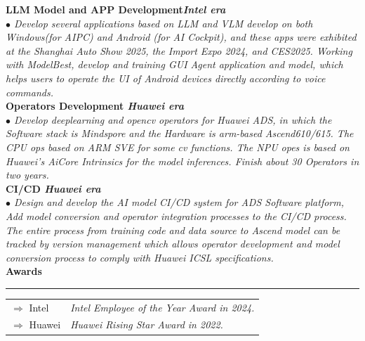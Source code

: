 \documentclass[a4paper,12pt,final]{memoir}
\newcommand{\myThemeColor}{RoyalBlue}
\newcommand{\SmallSep}{\vspace{0.9em}}
\newcommand{\CVSection}[1]
	{\Large\textbf{#1}\par
	\vspace{0.2cm}\normalsize\normalfont}
\newcommand{\CVItem}[1]
	{\textbf{\color{\myThemeColor} #1}}
\begin{document}
\begin{CJK*}{UTF8}{gbsn}
\CVItem{LLM Model and APP Development\hfill\emph{Intel era}}\\
\textit{$\bullet$ 
Develop several applications based on LLM and VLM develop on both Windows(for AIPC) and Android (for AI Cockpit), and these apps were exhibited at the Shanghai Auto Show 2025, the Import Expo 2024, and CES2025.  Working with ModelBest, develop and training GUI Agent application and model, which helps users to operate the UI of Android devices directly according to voice commands.} 
\\
\CVItem{Operators Development \hfill\emph{Huawei era}}\\
\textit{$\bullet$ Develop deeplearning and opencv operators for Huawei ADS, in which the Software stack is Mindspore and the Hardware is arm-based Ascend610/615. The CPU ops based on ARM SVE for some cv functions. The NPU opes is based on Huawei’s AiCore Intrinsics for the model inferences. Finish about 30 Operators in two years.}
\\
\CVItem{CI/CD \hfill\emph{Huawei era}}\\
\textit{$\bullet$ 
Design and develop the AI model CI/CD system for ADS Software platform, Add model conversion and operator integration processes to the CI/CD process. The entire process from training code and data source to Ascend model can be tracked by version management which allows operator development and model conversion process to comply with Huawei ICSL specifications. }
\\

\CVSection{Awards}
\hrule
\SmallSep
	\begin{tabular}{l|l}
		$\Rightarrow$ Intel &\textit{Intel Employee of the Year Award in 2024.}\footnotesize\\
		$\Rightarrow$ Huawei&\textit{ Huawei Rising Star Award in 2022.}\\
	\end{tabular}

\end{CJK*}
\end{document}
